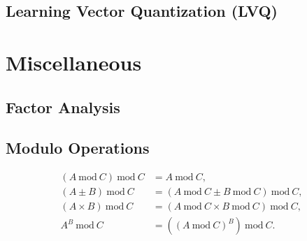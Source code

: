 \subsection{Learning Vector Quantization (LVQ)}
\label{additional:supervised:kNN:LVQ}

\section{Miscellaneous}
\label{additional:misc}

\subsection{Factor Analysis}
\label{additional:misc:factor_ana}

\subsection{Modulo Operations}
\label{additional:misc:modulo}

\begin{subequations}\label{eq:additional:misc:modulo}
\begin{align}
\left(A~\text{mod}~C\right)~\text{mod}~C &= A~\text{mod}~C, \label{eq:misc:additional:modulo:basic} \\
\left(A \pm B\right)~\text{mod}~C &= \left(A~\text{mod}~C \pm B~\text{mod}~C\right)~\text{mod}~C, \label{eq:misc:additional:modulo:pm} \\
\left(A \times B\right)~\text{mod}~C &= \left(A~\text{mod}~C \times B~\text{mod}~C\right)~\text{mod}~C, \label{eq:misc:additional:modulo:multiplication} \\
A^{B}~\text{mod}~C &= \left(\left(A~\text{mod}~C\right)^{B}\right)~\text{mod}~C. \label{eq:misc:additional:modulo:exp}
\end{align}
\end{subequations}

